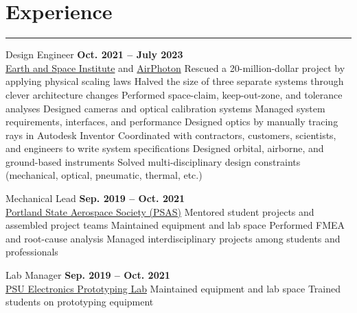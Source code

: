 \section{Experience}
\noindent\rule{\textwidth}{\hlinewidth}

\begin{innerlist}
    \item Design Engineer \hfill\textbf{Oct. 2021 -- July 2023}
    \\ \href{https://esi.umbc.edu/}{Earth and Space Institute} and \href{https://www.airphoton.com/}{AirPhoton}
        \subitem Rescued a 20-million-dollar project by applying physical scaling laws
        \subitem Halved the size of three separate systems through clever architecture changes
        \subitem Performed space-claim, keep-out-zone, and tolerance analyses 
        \subitem Designed cameras and optical calibration systems
        \subitem Managed system requirements, interfaces, and performance
        \subitem Designed optics by manually tracing rays in Autodesk Inventor
        \subitem Coordinated with contractors, customers, scientists, and engineers to write system specifications
        \subitem Designed orbital, airborne, and ground-based instruments
        \subitem Solved multi-disciplinary design constraints (mechanical, optical, pneumatic, thermal, etc.)
	\item Mechanical Lead \hfill\textbf{Sep. 2019 -- Oct. 2021} 
    \\ \href{https://www.pdxaerospace.org/}{Portland State Aerospace Society (PSAS)}
		\subitem Mentored student projects and assembled project teams
		\subitem Maintained equipment and lab space
		\subitem Performed FMEA and root-cause analysis
		\subitem Managed interdisciplinary projects among students and professionals
    \item Lab Manager \hfill\textbf{Sep. 2019 -- Oct. 2021}
    \\ \href{https://psu-epl.github.io/}{PSU Electronics Prototyping Lab}
		\subitem Maintained equipment and lab space
		\subitem Trained students on prototyping equipment

\end{innerlist}
